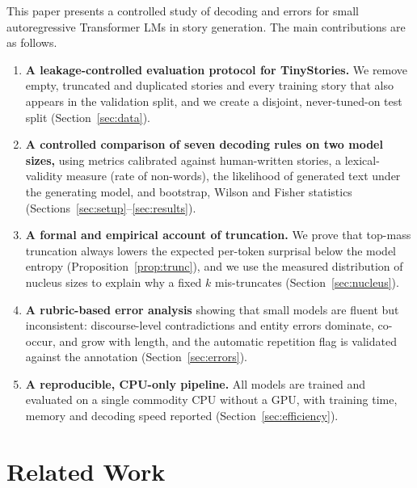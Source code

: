 \documentclass[journal]{IEEEtran}
\begin{document}
This paper presents a controlled study of decoding and errors for small autoregressive Transformer LMs in story generation. The main contributions are as follows.
\begin{enumerate}
\item \textbf{A leakage-controlled evaluation protocol for TinyStories.} We remove empty, truncated and duplicated stories and every training story that also appears in the validation split, and we create a disjoint, never-tuned-on test split (Section~\ref{sec:data}).
\item \textbf{A controlled comparison of seven decoding rules on two model sizes,} using metrics calibrated against human-written stories, a lexical-validity measure (rate of non-words), the likelihood of generated text under the generating model, and bootstrap, Wilson and Fisher statistics (Sections~\ref{sec:setup}--\ref{sec:results}).
\item \textbf{A formal and empirical account of truncation.} We prove that top-mass truncation always lowers the expected per-token surprisal below the model entropy (Proposition~\ref{prop:trunc}), and we use the measured distribution of nucleus sizes to explain why a fixed $k$ mis-truncates (Section~\ref{sec:nucleus}).
\item \textbf{A rubric-based error analysis} showing that small models are fluent but inconsistent: discourse-level contradictions and entity errors dominate, co-occur, and grow with length, and the automatic repetition flag is validated against the annotation (Section~\ref{sec:errors}).
\item \textbf{A reproducible, CPU-only pipeline.} All models are trained and evaluated on a single commodity CPU without a GPU, with training time, memory and decoding speed reported (Section~\ref{sec:efficiency}).
\end{enumerate}

\section{Related Work}
\label{sec:related}
\end{document}
